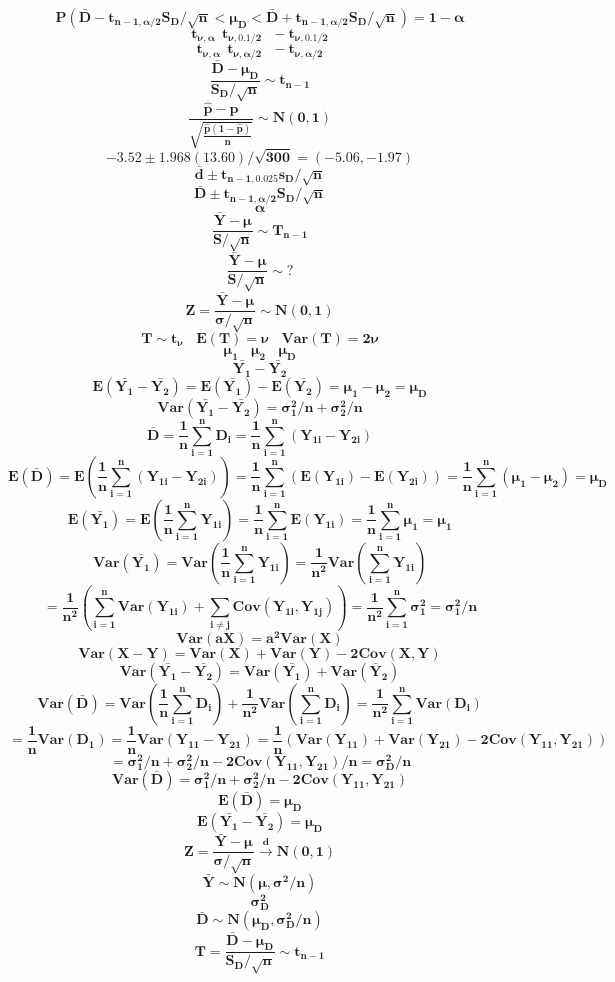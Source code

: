 \documentclass[12pt,portrait,semhelv,semrot]{article}
\begin{document}
{{$$\boldsymbol{P\left(\bar{D}-t_{n-1,\alpha/2}S_D/\sqrt{n} <  \mu_D <\bar{D}+t_{n-1,\alpha/2}S_D/\sqrt{n} \right) = 1-\alpha}$$
$$\boldsymbol{t_{\nu, \alpha} ~~t_{\nu, 0.1/2}~~~-t_{\nu, 0.1/2}}$$
$$\boldsymbol{t_{\nu, \alpha} ~~t_{\nu, \alpha/2}~~~-t_{\nu, \alpha/2}}$$
$$\boldsymbol{\frac{\bar{D}-\mu_D}{S_D/\sqrt{n}}\sim t_{n-1}}$$
$$\boldsymbol{\frac{\hat{p}-p}{\sqrt{\frac{\hat{p}(1-\hat{p})}{n}}}\sim N(0,1)}$$		
$$\boldsymbol{-3.52\pm 1.968(13.60)/\sqrt{300} = (-5.06, -1.97)}$$
$$\boldsymbol{\bar{d}\pm t_{n-1,0.025}s_D/\sqrt{n}}$$
$$\boldsymbol{\bar{D}\pm t_{n-1,\alpha/2}S_D/\sqrt{n}}$$
$$\boldsymbol{\alpha}$$
		$$\boldsymbol{\frac{\bar{Y}-\mu}{S/\sqrt{n}} \sim T_{n-1}}$$			$$\boldsymbol{\frac{\bar{Y}-\mu}{S/\sqrt{n}} \sim ?}$$		
		$$\boldsymbol{Z = \frac{\bar{Y}-\mu}{\sigma/\sqrt{n}} \sim N(0,1)}$$
$$\boldsymbol{T \sim t_{\nu}~~~~E(T) = \nu~~~~Var(T) = 2\nu}$$
$$\boldsymbol{\mu_1~~~~\mu_2~~~~\mu_D}$$
$$\boldsymbol{\bar{Y_1}-\bar{Y_2}}$$
$$\boldsymbol{E\left(\bar{Y_1}-\bar{Y_2}\right)= E\left(\bar{Y_1}\right) - E\left(\bar{Y_2}\right) = \mu_1-\mu_2 = \mu_D}$$
$$\boldsymbol{Var\left(\bar{Y_1}-\bar{Y_2}\right)= \sigma_1^2/n+\sigma^2_2/n}$$
$$\boldsymbol{\bar{D} = \frac{1}{n}\sum_{i=1}^{n}D_i = \frac{1}{n}\sum_{i=1}^{n}(Y_{1i}-Y_{2i})}$$ 
$$\boldsymbol{E\left(\bar{D}\right) = E\left(\frac{1}{n}\sum_{i=1}^{n}(Y_{1i}-Y_{2i})\right) = \frac{1}{n}\sum_{i=1}^{n}\left(E\left(Y_{1i}\right)-E\left(Y_{2i}\right)\right) = \frac{1}{n}\sum_{i=1}^{n}(\mu_1-\mu_2) = \mu_D}$$
$$\boldsymbol{E\left(\bar{Y_1}\right) = E\left(\frac{1}{n}\sum_{i=1}^{n}Y_{1i}\right) = \frac{1}{n}\sum_{i=1}^{n}E(Y_{1i}) = \frac{1}{n}\sum_{i=1}^{n}\mu_1 = \mu_1}$$
$$\boldsymbol{Var\left(\bar{Y_1}\right) = Var\left(\frac{1}{n}\sum_{i=1}^{n}Y_{1i}\right) = \frac{1}{n^2}Var\left(\sum_{i=1}^{n}Y_{1i}\right)}$$
$$\boldsymbol{= \frac{1}{n^2}\left(\sum_{i=1}^{n}Var(Y_{1i}) + \sum_{i\neq j} Cov(Y_{1i}, Y_{1j})\right) = \frac{1}{n^2}\sum_{i=1}^{n}\sigma_1^2 = \sigma_1^2/n}$$
$$\boldsymbol{Var(aX) = a^2 Var(X)}$$
$$\boldsymbol{Var(X-Y) = Var(X) + Var(Y) -2Cov(X,Y)}$$
$$\boldsymbol{Var\left(\bar{Y_1}-\bar{Y_2}\right) = Var\left(\bar{Y_1}\right) + Var\left(\bar{Y}_2\right)}$$
$$\boldsymbol{Var\left(\bar{D}\right) = Var\left(\frac{1}{n}\sum_{i=1}^{n}D_i\right) + \frac{1}{n^2}Var\left(\sum_{i=1}^{n}D_i\right)= \frac{1}{n^2}\sum_{i=1}^{n}Var(D_i)}$$
$$\boldsymbol{ = \frac{1}{n}Var(D_1) = \frac{1}{n}Var(Y_{11}-Y_{21}) = \frac{1}{n}\left(Var(Y_{11})+Var(Y_{21}) -2Cov(Y_{11}, Y_{21})\right)}$$
$$\boldsymbol{ = \sigma^2_1/n+\sigma^2_2/n-2Cov(Y_{11},Y_{21})/n = \sigma^2_D/n}$$
$$\boldsymbol{Var\left(\bar{D}\right) = \sigma^2_1/n+\sigma^2_2/n-2Cov(Y_{11},Y_{21})}$$
$$\boldsymbol{E\left(\bar{D}\right) = \mu_D}$$
$$\boldsymbol{E\left(\bar{Y_1}-\bar{Y_2}\right) = \mu_D}$$
$$\boldsymbol{Z = \frac{\bar{Y}-\mu}{\sigma/\sqrt{n}}\stackrel{d}\rightarrow N(0, 1)}$$
$$\boldsymbol{\bar{Y}\sim N(\mu, \sigma^2/n)}$$
$$\boldsymbol{\sigma^2_D}$$
$$\boldsymbol{\bar{D}\sim N(\mu_D, \sigma_D^2/n)}$$
$$\boldsymbol{T = \frac{\bar{D}-\mu_D}{S_D/\sqrt{n}}\sim t_{n-1}}$$
}
}
\end{document}
